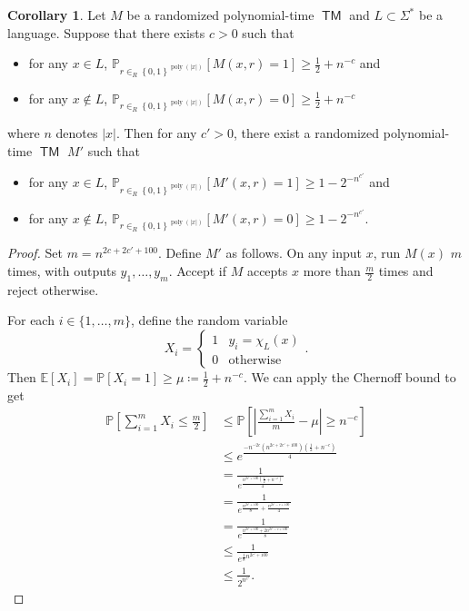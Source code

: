 \documentclass[10pt,letterpaper,cm]{nupset}
\theoremstyle{definition}
\theoremstyle{theorem}
\newtheorem{corollary}[definition]{Corollary}
\theoremstyle{remark}
\newcommand{\1}{\mathbf{1}}
\newcommand{\0}{\vec 0}
\DeclareMathOperator{\TM}{\mathsf{TM}}
\DeclareMathOperator{\poly}{poly}
\begin{document}
\begin{corollary}
Let $M$ be a randomized polynomial-time $\TM$ and $L\subset \Sigma^{\ast}$ be a language. Suppose that there exists $c>0$ such that
\begin{itemize}
\item for any $x\in L$, $\mathbb{P}_{r\in_R \left\{0,1\right\}^{\poly(\left\lvert{x}\right\rvert)}}\left[M(x,r)=1\right] \geq \frac{1}{2} +n^{-c}$ and
\item for any $x\notin L$, $\mathbb{P}_{r\in_R \left\{0,1\right\}^{\poly(\left\lvert{x}\right\rvert)}}\left[M(x,r)=0\right] \geq \frac{1}{2} + n^{-c}$
\end{itemize} where $n$ denotes $\left\lvert{x}\right\rvert$.
Then for any $c' >0$, there exist a randomized polynomial-time $\TM$ $M'$ such that 
\begin{itemize}
\item for any $x\in L$, $\mathbb{P}_{r\in_R \left\{0,1\right\}^{\poly(\left\lvert{x}\right\rvert)}}\left[M'(x,r)=1\right] \geq 1 - 2^{{-}n^{c'}}$ and
\item for any $x\notin L$, $\mathbb{P}_{r\in_R \left\{0,1\right\}^{\poly(\left\lvert{x}\right\rvert)}}\left[M'(x,r)=0\right] \geq 1 - 2^{{-}n^{c'}}$.
\end{itemize}
\end{corollary}
\begin{proof}
Set $m = n^{2c + 2c' + 100}$. Define $M'$ as follows. On any input $x$, run $M(x)$ $m$ times, with outputs $y_1, \ldots, y_m$. Accept if $M$ accepts $x$ more than $\frac{m}{2}$ times and reject otherwise.

\medskip

  For each $i\in \{1, \ldots, m\}$, define the random variable $$ X_i = \begin{cases} 1 & y_i = \chi_L(x) \\ 0 & \text{otherwise} \end{cases} .$$ Then $\mathbb{E}[X_i] = \mathbb{P}[X_i=1] \geq \mu\coloneqq \frac{1}{2} + n^{{-}c}$. We can apply the Chernoff bound to get   
\begin{align*}
 \mathbb{P}\left[\sum_{i=1}^m X_i \leq \frac{m}{2}\right] & \leq \mathbb{P}\left[ \left\lvert{\frac{\sum_{i=1}^m X_i}{m} -\mu}\right\rvert \geq n^{-c}\right] 
\\ & \leq
 e^{ \frac{ {-}n^{{-2}c}(n^{2c + 2c' + 100})(\frac{1}{2}+ n^{-c})}{4}
 }
 \\ & = \frac{1}{e^{\frac{ n^{2c' +100}(\frac{1}{2} + n^{{-}c} )                 }{  4   }}  }
 \\ & = \frac{1}{e^{ \frac{n^{2c' +100}}{8} +\frac{n^{2c' -c+100}}{4}          }}
 \\ & =  \frac{1}{e^{ \frac{n^{2c' +100} + 2 n^{2c' -c+100}}{8}       }}
 \\ &
 \leq \frac{1}{e^{\frac{1}{8}n^{2c' +100}}   }
 \\ & \leq \frac{1}{2^{n^{c'}}} . 
\end{align*} 
\end{proof}
\end{document}
